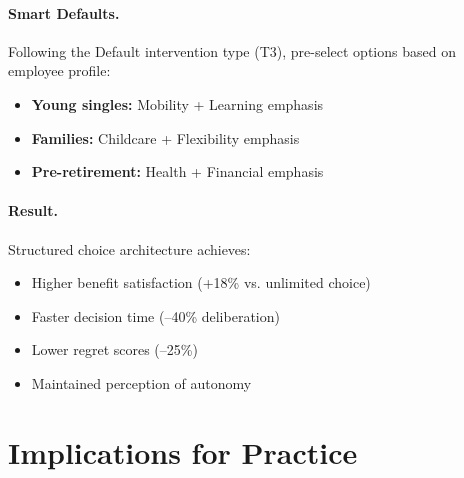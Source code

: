 \paragraph{Smart Defaults.}

Following the Default intervention type (T3), pre-select options based on employee profile:

\begin{itemize}[nosep]
    \item \textbf{Young singles:} Mobility + Learning emphasis
    \item \textbf{Families:} Childcare + Flexibility emphasis
    \item \textbf{Pre-retirement:} Health + Financial emphasis
\end{itemize}

\paragraph{Result.} Structured choice architecture achieves:
\begin{itemize}[nosep]
    \item Higher benefit satisfaction (+18\% vs. unlimited choice)
    \item Faster decision time (--40\% deliberation)
    \item Lower regret scores (--25\%)
    \item Maintained perception of autonomy
\end{itemize}


\section{Implications for Practice}
\label{sec:hhh-practice}

